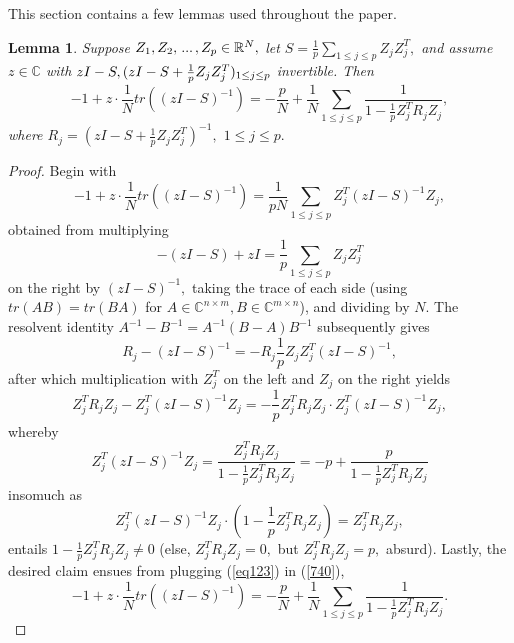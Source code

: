 \documentclass{article}
\newtheorem{lemma}{Lemma}
\numberwithin{equation}{section}
\begin{document}
This section contains a few lemmas used throughout the paper.

\begin{lemma}\label{ledoitpechelemma}
Suppose \(Z_1,Z_2,\hspace{0.05cm}...\hspace{0.05cm},Z_p \in \mathbb{R}^N,\) let \(S=\frac{1}{p}\sum_{1 \leq j \leq p}{Z_jZ_j^T},\) and assume \(z \in \mathbb{C}\) with \(zI-S, \newline (zI-S+\frac{1}{p}Z_jZ_j^T)_{1 \leq j \leq p}\) invertible. Then 
    \[-1+z \cdot \frac{1}{N}tr((zI-S)^{-1})=-\frac{p}{N}+\frac{1}{N}\sum_{1 \leq j \leq p}{\frac{1}{1-\frac{1}{p}Z_j^TR_jZ_j}},\]
where \(R_j=(zI-S+\frac{1}{p}Z_jZ_j^T)^{-1},\) \(1 \leq j \leq p.\) %
\end{lemma}

\begin{proof}
    Begin with
\begin{equation}\label{740}
    -1+z\cdot \frac{1}{N}tr((zI-S)^{-1})=\frac{1}{pN}\sum_{1 \leq j \leq p}{Z_j^T(zI-S)^{-1}Z_j},
\end{equation}
obtained from multiplying
\[-(zI-S)+zI=\frac{1}{p}\sum_{1 \leq j \leq p}{Z_jZ_j^T}\]
on the right by \((zI-S)^{-1},\) taking the trace of each side (using \(tr(AB)=tr(BA)\) for \(A \in \mathbb{C}^{n \times m},B \in \mathbb{C}^{m \times n}\)), and dividing by \(N.\) The resolvent identity \(A^{-1}-B^{-1}=A^{-1}(B-A)B^{-1}\) subsequently gives
\[R_j-(zI-S)^{-1}=-R_j \frac{1}{p}Z_jZ_j^T (zI-S)^{-1},\]
after which multiplication with \(Z_j^T\) on the left and \(Z_j\) on the right yields
\[Z_j^TR_jZ_j-Z_j^T(zI-S)^{-1}Z_j=-\frac{1}{p}Z_j^TR_j Z_j \cdot Z_j^T (zI-S)^{-1}Z_j,\]
whereby
\begin{equation}\label{eq123}
    Z_j^T(zI-S)^{-1}Z_j=\frac{Z_j^TR_jZ_j}{1-\frac{1}{p}Z_j^TR_jZ_j}=-p+\frac{p}{1-\frac{1}{p}Z_j^TR_jZ_j}
\end{equation}
insomuch as
\[Z_j^T(zI-S)^{-1}Z_j \cdot (1-\frac{1}{p}Z_j^TR_jZ_j)=Z_j^TR_jZ_j,\]
entails \(1-\frac{1}{p}Z_j^TR_jZ_j \neq 0\) (else, \(Z_j^TR_jZ_j=0,\) but \(Z_j^TR_jZ_j=p,\) absurd). Lastly, the desired claim ensues from plugging (\ref{eq123}) in (\ref{740}), 
\[-1+z\cdot \frac{1}{N}tr((zI-S)^{-1})=-\frac{p}{N}
    +\frac{1}{N}\sum_{1 \leq j \leq p}{\frac{1}{1-\frac{1}{p}Z_j^TR_jZ_j}}.\]%
\end{proof}
\end{document}
